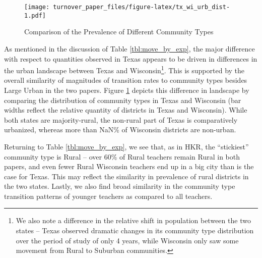 \documentclass[]{article}
\let\rmarkdownfootnote\footnote%
\def\footnote{\protect\rmarkdownfootnote}
\begin{document}
\begin{figure}[htbp]
\centering
\texttt{[image: turnover\_paper\_files/figure-latex/tx\_wi\_urb\_dist-1.pdf]}
\caption{\label{fig:ti_wi_urb}Comparison of the Prevalence of Different
Community Types}
\end{figure}

As mentioned in the discussion of Table \ref{tbl:move_by_exp}, the major
difference with respect to quantities observed in Texas appears to be
driven in differences in the urban landscape between Texas and
Wisconsin\footnote{We also note a difference in the relative shift in
  population between the two states -- Texas observed dramatic changes
  in its community type distribution over the period of study of only 4
  years, while Wisconsin only saw some movement from Rural to Suburban
  communities.}. This is supported by the overall similarity of
magnitudes of transition rates to community types besides Large Urban in
the two papers. Figure \ref{fig:ti_wi_urb} depicts this difference in
landscape by comparing the distribution of community types in Texas and
Wisconsin (bar widths reflect the relative quantity of districts in
Texas and Wisconsin). While both states are majority-rural, the
non-rural part of Texas is comparatively urbanized, whereas more than
NaN\% of Wisconsin districts are non-urban.

Returning to Table \ref{tbl:move_by_exp}, we see that, as in HKR, the
``stickiest'' community type is Rural -- over 60\% of Rural teachers
remain Rural in both papers, and even fewer Rural Wisconsin teachers end
up in a big city than is the case for Texas. This may reflect the
similarity in prevalence of rural districts in the two states. Lastly,
we also find broad similarity in the community type transition patterns
of younger teachers as compared to all teachers.
\end{document}
